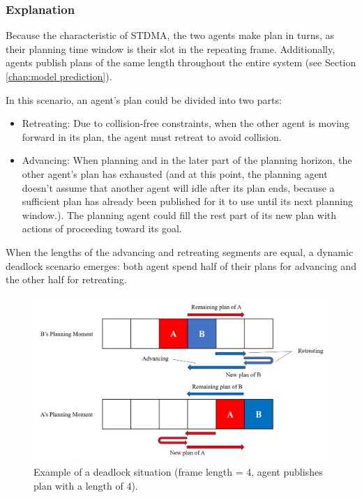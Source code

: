 \subsubsection{Explanation}

Because the characteristic of STDMA, the two agents make plan in turns, as their planning time window is their slot in the repeating frame.
Additionally, agents publish plans of the same length throughout the entire system (see Section \ref{chap:model prediction}).

In this scenario, an agent's plan could be divided into two parts:
\begin{itemize}
    \item Retreating: Due to collision-free constraints, when the other agent is moving forward in its plan, the agent must retreat to avoid collision.
    \item Advancing: When planning and in the later part of the planning horizon, the other agent's plan has exhausted (and at this point, the planning agent doesn't assume that another agent will idle after its plan ends, because a sufficient plan has already been published for it to use until its next planning window.). The planning agent could fill the rest part of its new plan with actions of proceeding toward its goal.
\end{itemize}

When the lengths of the advancing and retreating segments are equal, a dynamic deadlock scenario emerges: 
both agent spend half of their plans for advancing and the other half for retreating.



\begin{figure}[htbp]
    \centering
    \includegraphics[width = \linewidth]{figures/deaclock_1.png}
    \caption{Example of a deadlock situation (frame length = 4, agent publishes plan with a length of 4).}%
    \label{fig:deadlock}
\end{figure}
\FloatBarrier

